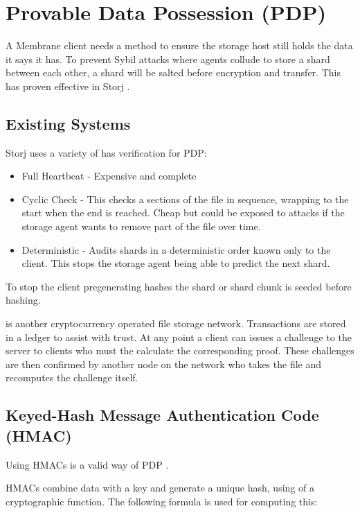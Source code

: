 \documentclass[11pt, a4paper, twocolumn, twoside]{report}
\begin{document}
\section{Provable Data Possession (PDP)} \label{sec:poo}

A Membrane client needs a method to ensure the storage host still holds the data it says it has. To prevent Sybil attacks where agents collude to store a shard between each other, a shard will be salted before encryption and transfer. This has proven effective in Storj \citep{Wilkinson14storja}.

\subsection{Existing Systems}

Storj uses a variety of has verification for PDP:

\begin{itemize}
 \item Full Heartbeat - Expensive and complete
 \item Cyclic Check - This checks a sections of the file in sequence, wrapping to the start when the end is reached. Cheap but could be exposed to attacks if the storage agent wants to remove part of the file over time.
 \item Deterministic - Audits shards in a deterministic order known only to the client. This stops the storage agent being able to predict the next shard.
\end{itemize}

To stop the client pregenerating hashes the shard or shard chunk is seeded before hashing.

\cite{filecoin2014filecoin} is another cryptocurrency operated file storage network. Transactions are stored in a ledger to assist with trust. At any point a client can issues a challenge to the server to clients who must the calculate the corresponding proof. These challenges are then confirmed by another node on the network who takes the file and recomputes the challenge itself.

\subsection{Keyed-Hash Message Authentication Code (HMAC)}

Using HMACs is a valid way of PDP \citep{ateniese2011remote}.

HMACs combine data with a key and generate a unique hash, using of a cryptographic function. \citep{krawczyk1997hmac} The following formula is used for computing this:
\end{document}
